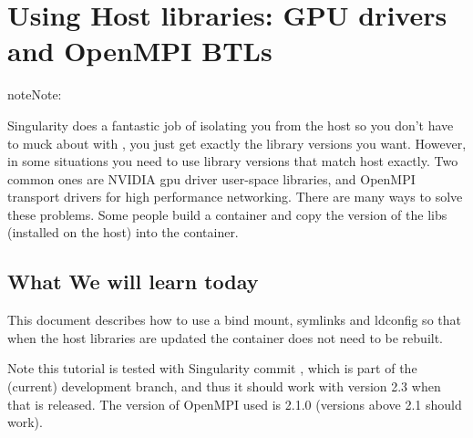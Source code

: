 \documentclass[letterpaper,10pt,english]{sphinxmanual}
\begin{document}
\section{Using Host libraries: GPU drivers and OpenMPI BTLs}
\label{\detokenize{appendix:using-host-libraries-gpu-drivers-and-openmpi-btls}}\label{\detokenize{appendix:sec-tutorial-gpu-drivers-and-openmpi}}
\begin{sphinxadmonition}{note}{Note:}
    
\end{sphinxadmonition}

Singularity does a fantastic job of isolating you from the host so you don’t have to muck
about with , you just get exactly the library versions you want. However,
in some situations you need to use library versions that match host exactly. Two common ones
are NVIDIA gpu driver user-space libraries, and OpenMPI transport drivers for high performance
networking. There are many ways to solve these problems. Some people build a container and copy
the version of the libs (installed on the host) into the container.


\subsection{What We will learn today}
\label{\detokenize{appendix:what-we-will-learn-today}}
This document describes how to use a bind mount, symlinks and ldconfig so that when the host
libraries are updated the container does not need to be rebuilt.

Note this tutorial is tested with Singularity commit ,
which is part of the (current) development branch, and thus it should work with version 2.3 when
that is released. The version of OpenMPI used is 2.1.0 (versions above 2.1 should work).
\end{document}
